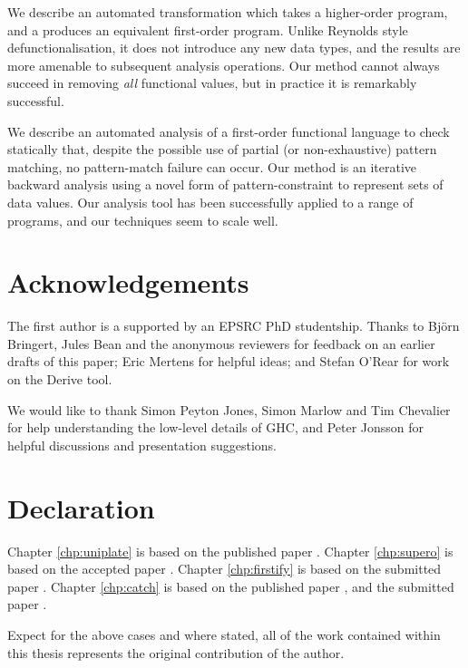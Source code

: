 We describe an automated transformation which takes a higher-order program, and a produces an equivalent first-order program. Unlike Reynolds style defunctionalisation, it does not introduce any new data types, and the results are more amenable to subsequent analysis operations. Our method cannot always succeed in removing \textit{all} functional values, but in practice it is remarkably successful.

We describe an automated analysis of a first-order functional language to check statically that, despite the possible use of partial (or non-exhaustive) pattern matching, no pattern-match failure can occur.  Our method is an iterative backward analysis using a novel form of pattern-constraint to represent sets of data values. Our analysis tool has been successfully applied to a range of programs, and our techniques seem to scale well.


\tableofcontents
\listoffigures
\listoftables

\chapter*{Acknowledgements}


The first author is a supported by an EPSRC PhD studentship. Thanks to Bj\"{o}rn Bringert, Jules Bean and the anonymous reviewers for feedback on an earlier drafts of this paper; Eric Mertens for helpful ideas; and Stefan O'Rear for work on the Derive tool.

We would like to thank Simon Peyton Jones, Simon Marlow and Tim Chevalier for help understanding the low-level details of GHC, and Peter Jonsson for helpful discussions and presentation suggestions.


\chapter*{Declaration}

Chapter \ref{chp:uniplate} is based on the published paper \cite{me:uniplate}. Chapter \ref{chp:supero} is based on the accepted paper \cite{me:supero}. Chapter \ref{chp:firstify} is based on the submitted paper \cite{me:firstify}. Chapter \ref{chp:catch} is based on the published paper \cite{me:catch_tfp}, and the submitted paper \cite{me:catch_icfp}.

Expect for the above cases and where stated, all of the work contained within this thesis represents the original contribution of the author.
